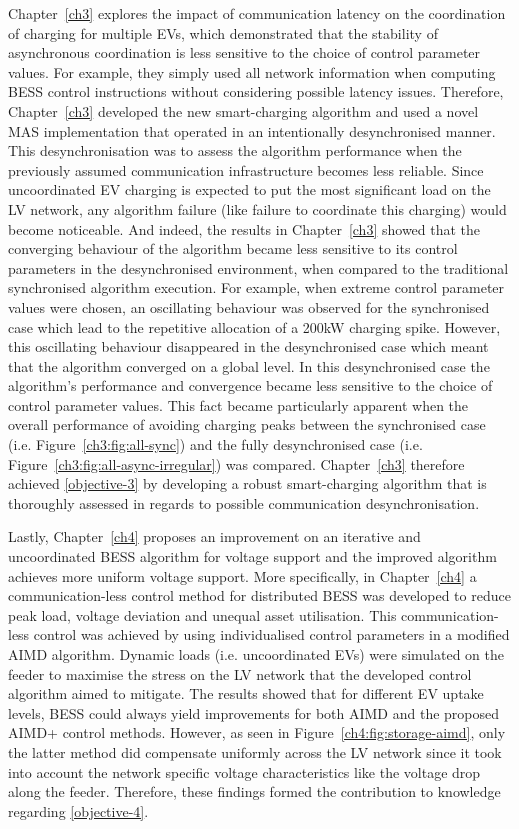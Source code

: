 Chapter~\ref{ch3} explores the impact of communication latency on the coordination of charging for multiple EVs, which demonstrated that the stability of asynchronous coordination is less sensitive to the choice of control parameter values.
For example, they simply used all network information when computing BESS control instructions without considering possible latency issues.
Therefore, Chapter~\ref{ch3} developed the new smart-charging algorithm and used a novel MAS implementation that operated in an intentionally desynchronised manner.
This desynchronisation was to assess the algorithm performance when the previously assumed communication infrastructure becomes less reliable.
Since uncoordinated EV charging is expected to put the most significant load on the LV network, any algorithm failure (like failure to coordinate this charging) would become noticeable.
And indeed, the results in Chapter~\ref{ch3} showed that the converging behaviour of the algorithm became less sensitive to its control parameters in the desynchronised environment, when compared to the traditional synchronised algorithm execution.
For example, when extreme control parameter values were chosen, an oscillating behaviour was observed for the synchronised case which lead to the repetitive allocation of a 200kW charging spike.
However, this oscillating behaviour disappeared in the desynchronised case which meant that the algorithm converged on a global level.
In this desynchronised case the algorithm's performance and convergence became less sensitive to the choice of control parameter values.
This fact became particularly apparent when the overall performance of avoiding charging peaks between the synchronised case (i.e. Figure~\ref{ch3:fig:all-sync}) and the fully desynchronised case (i.e. Figure~\ref{ch3:fig:all-async-irregular}) was compared.
Chapter~\ref{ch3} therefore achieved \ref{objective-3} by developing a robust smart-charging algorithm that is thoroughly assessed in regards to possible communication desynchronisation.

Lastly, Chapter~\ref{ch4} proposes an improvement on an iterative and uncoordinated BESS algorithm for voltage support and the improved algorithm achieves more uniform voltage support.
More specifically, in Chapter~\ref{ch4} a communication-less control method for distributed BESS was developed to reduce peak load, voltage deviation and unequal asset utilisation.
This communication-less control was achieved by using individualised control parameters in a modified AIMD algorithm.
Dynamic loads (i.e. uncoordinated EVs) were simulated on the feeder to maximise the stress on the LV network that the developed control algorithm aimed to mitigate.
The results showed that for different EV uptake levels, BESS could always yield improvements for both AIMD and the proposed AIMD+ control methods.
However, as seen in Figure~\ref{ch4:fig:storage-aimd}, only the latter method did compensate uniformly across the LV network since it took into account the network specific voltage characteristics like the voltage drop along the feeder.
Therefore, these findings formed the contribution to knowledge regarding \ref{objective-4}.

